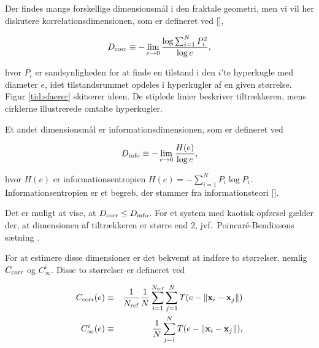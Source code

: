 \vspace{4.0mm}
Der findes mange forskellige dimensionsm{\aa}l i den
fraktale geometri, men vi vil her diskutere
korrelationsdimensionen, som er defineret ved
[],

\begin{equation}
  D_{{\rm corr}} \equiv -\lim_{e\rightarrow 0} \frac{\log\sum_{i=1}^N
P_i^2}{\log e},
\end{equation}

hvor $P_i$ er sandsynligheden for at finde en tilstand i
den $i$'te hyperkugle med diameter $e$, idet
tilstandsrummet opdeles i hyperkugler af en given
st{\o}rrelse. Figur \ref{tid:sfaerer} skitserer ideen. De
stiplede linier beskriver tiltr{\ae}kkeren, mens cirklerne
illustrerede omtalte hyperkugler.


Et andet dimensionsm{\aa}l er informationsdimensionen, som
er defineret ved

\begin{equation}
  D_{\rm info} \equiv -\lim_{e\rightarrow 0} \frac{H(e)}{\log e},
\end{equation}

hvor $H(e)$ er informationsentropien $H(e) = -\sum_{i=1}^N P_i \log P_i$.
Informationsentropien er et begreb, der stammer fra
informationsteori [].

\vspace{4.0mm}
Det er muligt at vise, at $D_{\rm corr} \le D_{\rm info}$.
For et system med kaotisk opf{\o}rsel g{\ae}lder der, at
dimensionen af tiltr{\ae}kkeren er st{\o}rre end 2, 
jvf.\ Poincar\'{e}-Bendixsons s{\ae}tning \cite{LichtLieb}.

\vspace{4.0mm}
For at estimere disse dimensioner er det bekvemt at
indf{\o}re to st{\o}rrelser, nemlig $C_{\rm corr}$ og
$C^i_\infty$. Disse to st{\o}rrelser er defineret ved

\begin{eqnarray*}
  C_{\rm corr}(e) &\equiv&
\frac{1}{N_{\rm ref}}\frac{1}{N}\sum_{i=1}^{N_{\rm ref}}\sum_{j=1}^{N}
T(e-\|\vec{x}_i-\vec{x}_j\|) \\
  C^i_\infty (e) &\equiv& \frac{1}{N}\sum_{j=1}^{N}
T(e-\|\vec{x}_i-\vec{x}_j\|), 
\end{eqnarray*}

